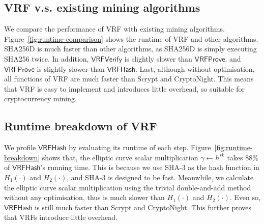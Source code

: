 \subsection{VRF v.s. existing mining algorithms}

We compare the performance of VRF with existing mining algorithms.
Figure~\ref{fig:runtime-comparison} shows the runtime of VRF and other algorithms.
SHA256D is much faster than other algorithms, as SHA256D is simply executing SHA256 twice.
In addition, $\mathsf{VRFVerify}$ is slightly slower than $\mathsf{VRFProve}$, and $\mathsf{VRFProve}$ is slightly slower than $\mathsf{VRFHash}$.
Last, although without optimisation, all functions of VRF are much faster than Scrypt and CryptoNight.
This means that VRF is easy to implement and introduces little overhead, so suitable for cryptocurrency mining.



\subsection{Runtime breakdown of VRF}

We profile $\mathsf{VRFHash}$ by evaluating its runtime of each step.
Figure~\ref{fig:runtime-breakdown} shows that, the elliptic curve scalar multiplication $\gamma \gets h^{sk}$ takes 88\% of $\mathsf{VRFHash}$'s running time.
This is because we use SHA-3 as the hash function in $H_1(\cdot)$ and $H_2(\cdot)$, and SHA-3 is designed to be fast.
Meanwhile, we calculate the elliptic curve scalar multiplication using the trivial double-and-add method without any optimisation, thus is much slower than $H_1(\cdot)$ and $H_2(\cdot)$.
Even so, $\mathsf{VRFHash}$ is still much faster than Scrypt and CryptoNight.
This further proves that VRFs introduce little overhead.